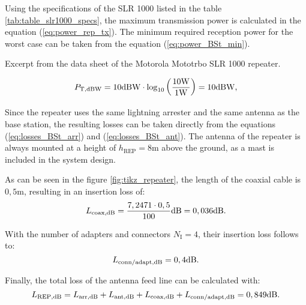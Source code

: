 Using the specifications of the SLR 1000 listed in the table \ref{tab:table_slr1000_specs}, the maximum transmission power is calculated in the equation (\ref{eq:power_rep_tx}). The minimum required reception power for the worst case can be taken from the equation (\ref{eq:power_BSt_min}).
\begin{table}[h!] %
	\centering
	
	\caption{Excerpt from the data sheet of the Motorola Mototrbo SLR 1000 repeater. \cite{SLR1000:2019}}
	\label{tab:table_slr1000_specs}
\end{table}
\begin{equation} \label{eq:power_rep_tx}
	\centering
	P_\mathrm{T,dBW} =  10\mathrm{dBW} \cdot \log_{10} \left( \dfrac{10\mathrm{W}}{1\mathrm{W}} \right) = 10\mathrm{dBW}\text{,}
\end{equation}

Since the repeater uses the same lightning arrester and the same antenna as the base station, the resulting losses can be taken directly from the equations (\ref{eq:losses_BSt_arr}) and (\ref{eq:losses_BSt_ant}). The antenna of the repeater is always mounted at a height of $h_\mathrm{REP} = 8\mathrm{m}$ above the ground, as a mast is included in the system design. 

As can be seen in the figure \ref{fig:tikz_repeater}, the length of the coaxial cable is $0,5\mathrm{m}$, resulting in an insertion loss of:   
\begin{equation} \label{eq:losses_BSt_coax}
	\centering
	L_\mathrm{coax,dB} = \dfrac{7,2471 \cdot 0,5}{100}\mathrm{dB} = 0,036\mathrm{dB}\text{.}
\end{equation}

With the number of adapters and connectors $N_\mathrm{I} = 4$, their insertion loss follows to:
\begin{equation} \label{eq:losses_rep_conn}
	\centering
	L_\mathrm{conn/adapt,dB} = 0,4\mathrm{dB}\text{.}
\end{equation}

Finally, the total loss of the antenna feed line can be calculated with:
\begin{equation} \label{eq:losses_rep}
	\centering
	L_\mathrm{REP,dB} = L_\mathrm{arr,dB} + L_\mathrm{ant,dB} + L_\mathrm{coax,dB} + L_\mathrm{conn/adapt,dB} = 0,849\mathrm{dB}\text{.}
\end{equation}
